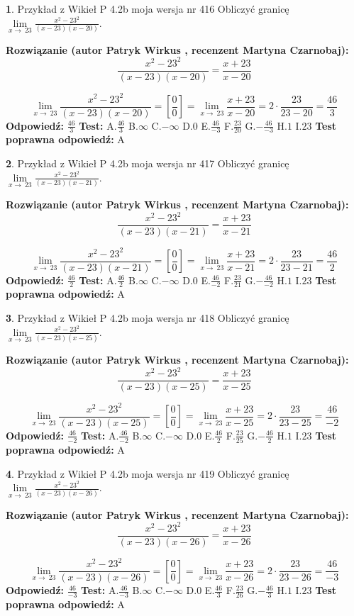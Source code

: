 \documentclass[12pt, a4paper]{article}
\theoremstyle{definition} %
\newtheorem{zad}{}
\newcommand{\zadStart}[1]{\begin{zad}#1\newline}
\newcommand{\zadStop}{\end{zad}}
\newcommand{\rozwStart}[2]{\noindent \textbf{Rozwiązanie (autor #1 , recenzent #2): }\newline}
\newcommand{\rozwStop}{\newline}
\newcommand{\odpStart}{\noindent \textbf{Odpowiedź:}\newline}
\newcommand{\odpStop}{\newline}
\newcommand{\testStart}{\noindent \textbf{Test:}\newline}
\newcommand{\testStop}{\newline}
\newcommand{\kluczStart}{\noindent \textbf{Test poprawna odpowiedź:}\newline}
\newcommand{\kluczStop}{\newline}
\begin{document}
\zadStart{Przykład z Wikieł P 4.2b moja wersja nr 416}
Obliczyć granicę $\lim\limits_{x\to\ 23}\frac{x^{2}-23^{2}}{(x-23)(x-20)}$.
\zadStop
\rozwStart{Patryk Wirkus}{Martyna Czarnobaj}
$$\frac{x^{2}-23^{2}}{(x-23)(x-20)}=\frac{x+23}{x-20}$$

$$\lim\limits_{x\to\ 23}\frac{x^{2}-23^{2}}{(x-23)(x-20)}=[\frac{0}{0}]=\lim\limits_{x\to\ 23}\frac{x+23}{x-20}=2 \cdot \frac{23}{23-20} = \frac{46}{3}$$
\rozwStop
\odpStart
$\frac{46}{3}$
\odpStop
\testStart
A.$\frac{46}{3}$
B.$\infty$
C.$-\infty$
D.$0$
E.$\frac{46}{-3}$
F.$\frac{23}{20}$
G.$-\frac{46}{-3}$
H.$1$
I.$23$
\testStop
\kluczStart
A
\kluczStop



\zadStart{Przykład z Wikieł P 4.2b moja wersja nr 417}
Obliczyć granicę $\lim\limits_{x\to\ 23}\frac{x^{2}-23^{2}}{(x-23)(x-21)}$.
\zadStop
\rozwStart{Patryk Wirkus}{Martyna Czarnobaj}
$$\frac{x^{2}-23^{2}}{(x-23)(x-21)}=\frac{x+23}{x-21}$$

$$\lim\limits_{x\to\ 23}\frac{x^{2}-23^{2}}{(x-23)(x-21)}=[\frac{0}{0}]=\lim\limits_{x\to\ 23}\frac{x+23}{x-21}=2 \cdot \frac{23}{23-21} = \frac{46}{2}$$
\rozwStop
\odpStart
$\frac{46}{2}$
\odpStop
\testStart
A.$\frac{46}{2}$
B.$\infty$
C.$-\infty$
D.$0$
E.$\frac{46}{-2}$
F.$\frac{23}{21}$
G.$-\frac{46}{-2}$
H.$1$
I.$23$
\testStop
\kluczStart
A
\kluczStop



\zadStart{Przykład z Wikieł P 4.2b moja wersja nr 418}
Obliczyć granicę $\lim\limits_{x\to\ 23}\frac{x^{2}-23^{2}}{(x-23)(x-25)}$.
\zadStop
\rozwStart{Patryk Wirkus}{Martyna Czarnobaj}
$$\frac{x^{2}-23^{2}}{(x-23)(x-25)}=\frac{x+23}{x-25}$$

$$\lim\limits_{x\to\ 23}\frac{x^{2}-23^{2}}{(x-23)(x-25)}=[\frac{0}{0}]=\lim\limits_{x\to\ 23}\frac{x+23}{x-25}=2 \cdot \frac{23}{23-25} = \frac{46}{-2}$$
\rozwStop
\odpStart
$\frac{46}{-2}$
\odpStop
\testStart
A.$\frac{46}{-2}$
B.$\infty$
C.$-\infty$
D.$0$
E.$\frac{46}{2}$
F.$\frac{23}{25}$
G.$-\frac{46}{2}$
H.$1$
I.$23$
\testStop
\kluczStart
A
\kluczStop



\zadStart{Przykład z Wikieł P 4.2b moja wersja nr 419}
Obliczyć granicę $\lim\limits_{x\to\ 23}\frac{x^{2}-23^{2}}{(x-23)(x-26)}$.
\zadStop
\rozwStart{Patryk Wirkus}{Martyna Czarnobaj}
$$\frac{x^{2}-23^{2}}{(x-23)(x-26)}=\frac{x+23}{x-26}$$

$$\lim\limits_{x\to\ 23}\frac{x^{2}-23^{2}}{(x-23)(x-26)}=[\frac{0}{0}]=\lim\limits_{x\to\ 23}\frac{x+23}{x-26}=2 \cdot \frac{23}{23-26} = \frac{46}{-3}$$
\rozwStop
\odpStart
$\frac{46}{-3}$
\odpStop
\testStart
A.$\frac{46}{-3}$
B.$\infty$
C.$-\infty$
D.$0$
E.$\frac{46}{3}$
F.$\frac{23}{26}$
G.$-\frac{46}{3}$
H.$1$
I.$23$
\testStop
\kluczStart
A
\kluczStop
\end{document}
